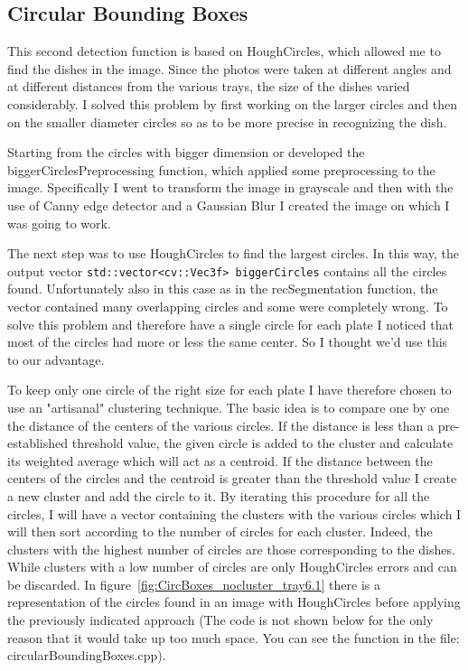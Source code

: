 \documentclass[
	a4paper, %
	10pt, %
	unnumberedsections, %
	twoside, %
]{LTJournalArticle}
\begin{document}
\subsection{Circular Bounding Boxes}
This second detection function is based on HoughCircles, which allowed me to find the dishes in the image. Since the photos were taken at different angles and at different distances from the various trays, the size of the dishes varied considerably. I solved this problem by first working on the larger circles and then on the smaller diameter circles so as to be more precise in recognizing the dish.

Starting from the circles with bigger dimension or developed the biggerCirclesPreprocessing function, which applied some preprocessing to the image. Specifically I went to transform the image in grayscale and then with the use of Canny edge detector and a Gaussian Blur I created the image on which I was going to work.

The next step was to use HoughCircles to find the largest circles. In this way, the output vector \texttt{std::vector<cv::Vec3f> biggerCircles} contains all the circles found. Unfortunately also in this case as in the recSegmentation function, the vector contained many overlapping circles and some were completely wrong. To solve this problem and therefore have a single circle for each plate I noticed that most of the circles had more or less the same center. So I thought we'd use this to our advantage.

To keep only one circle of the right size for each plate I have therefore chosen to use an "artisanal" clustering technique. The basic idea is to compare one by one the distance of the centers of the various circles. If the distance is less than a pre-established threshold value, the given circle is added to the cluster and calculate its weighted average which will act as a centroid. If the distance between the centers of the circles and the centroid is greater than the threshold value I create a new cluster and add the circle to it. By iterating this procedure for all the circles, I will have a vector containing the clusters with the various circles which I will then sort according to the number of circles for each cluster. Indeed, the clusters with the highest number of circles are those corresponding to the dishes. While clusters with a low number of circles are only HoughCircles errors and can be discarded. In figure~\ref{fig:CircBoxes_nocluster_tray6.1} there is a representation of the circles found in an image with HoughCircles before applying the previously indicated approach (The code is not shown below for the only reason that it would take up too much space. You can see the function in the file: circularBoundingBoxes.cpp). 
\end{document}
